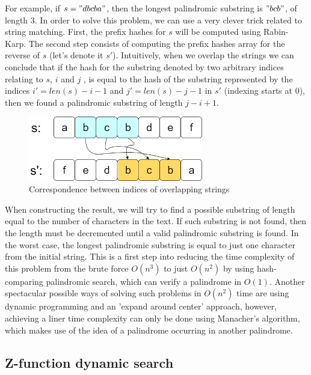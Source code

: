 \documentclass[letterpaper]{article}
\begin{document}
For example, if $s = "dbcba"$, then the longest palindromic substring is $"bcb"$, of length 3. In order to solve this problem, we can use a very clever trick related to string matching. First, the prefix hashes for $s$ will be computed using Rabin-Karp. The second step consists of computing the prefix hashes array for the reverse of $s$ (let's denote it $s'$). Intuitively, when we overlap the strings we can conclude that if the hash for the substring denoted by two arbitrary indices relating to $s$, $i$ and $j$ , is equal to the hash of the substring represented by the indices $i' = len(s) - i - 1$ and $j' = len(s) - j - 1$ in $s'$ (indexing starts at 0), then we found a palindromic substring of length $j - i + 1$.

\begin{figure} [h!]
\centering
\includegraphics[width=0.68\textwidth]{pngOfDiagrams/reversePrefix.png}
\caption{Correspondence between indices of overlapping strings}
\end{figure}

When constructing the result, we will try to find a possible substring of length equal to the number of characters in the text. If such substring is not found, then the length must be decremented until a valid palindromic substring is found. In the worst case, the longest palindromic substring is equal to just one character from the initial string. This is a first step into reducing the time complexity of this problem from the brute force $O(n^{3})$ to just $O(n^{2})$ by using hash-comparing palindromic search, which can verify a palindrome in $O(1)$. Another spectacular possible ways of solving such problems in $O(n^{2})$ time are using dynamic programming and an 'expand around center' approach, however, achieving a liner time complexity can only be done using Manacher's algorithm, which makes use of the idea of a palindrome occurring in another palindrome. 

\newpage


\subsection{Z-function dynamic search}
\end{document}
